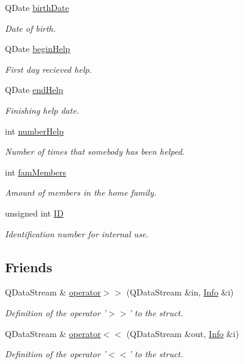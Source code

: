 \begin{DoxyCompactItemize}
Q\+Date \hyperlink{struct_info_a3c37c78a0e01a9b8871adddce7451e53}{birth\+Date}
\begin{DoxyCompactList}\small\item\em Date of birth. \end{DoxyCompactList}\item 
Q\+Date \hyperlink{struct_info_a0b9f2e6014fe7a54993c36d15450b7e0}{begin\+Help}
\begin{DoxyCompactList}\small\item\em First day recieved help. \end{DoxyCompactList}\item 
Q\+Date \hyperlink{struct_info_ae81557ef74d11f90fa17f8e2948028a5}{end\+Help}
\begin{DoxyCompactList}\small\item\em Finishing help date. \end{DoxyCompactList}\item 
int \hyperlink{struct_info_aa7475a4d5b9b5e8cd5ff698942dee78f}{number\+Help}
\begin{DoxyCompactList}\small\item\em Number of times that somebody has been helped. \end{DoxyCompactList}\item 
int \hyperlink{struct_info_ade80df067f691d4120a15ef8dc095a74}{fam\+Members}
\begin{DoxyCompactList}\small\item\em Amount of members in the home family. \end{DoxyCompactList}\item 
unsigned int \hyperlink{struct_info_a0c88224e0958874dd2171d8707cb3a5b}{I\+D}
\begin{DoxyCompactList}\small\item\em Identification number for internal use. \end{DoxyCompactList}\end{DoxyCompactItemize}
\subsection*{Friends}
\begin{DoxyCompactItemize}
\item 
Q\+Data\+Stream \& \hyperlink{struct_info_abcc9ca92dd5c05367bd2807464e03747}{operator$>$$>$} (Q\+Data\+Stream \&in, \hyperlink{struct_info}{Info} \&i)
\begin{DoxyCompactList}\small\item\em Definition of the operator '$>$$>$' to the struct. \end{DoxyCompactList}\item 
Q\+Data\+Stream \& \hyperlink{struct_info_ab0cbd32d9d3f6f6d176b81093daa6a70}{operator$<$$<$} (Q\+Data\+Stream \&out, \hyperlink{struct_info}{Info} \&i)
\begin{DoxyCompactList}\small\item\em Definition of the operator '$<$$<$' to the struct. \end{DoxyCompactList}\end{DoxyCompactItemize}



